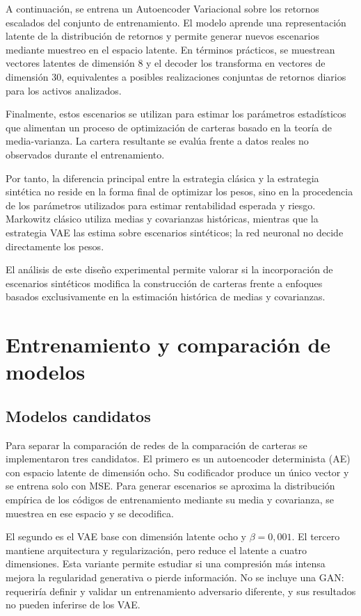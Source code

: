 A continuación, se entrena un Autoencoder Variacional sobre los retornos escalados del conjunto de entrenamiento. El modelo aprende una representación latente de la distribución de retornos y permite generar nuevos escenarios mediante muestreo en el espacio latente. En términos prácticos, se muestrean vectores latentes de dimensión 8 y el decoder los transforma en vectores de dimensión 30, equivalentes a posibles realizaciones conjuntas de retornos diarios para los activos analizados.

Finalmente, estos escenarios se utilizan para estimar los parámetros estadísticos que alimentan un proceso de optimización de carteras basado en la teoría de media-varianza. La cartera resultante se evalúa frente a datos reales no observados durante el entrenamiento.

Por tanto, la diferencia principal entre la estrategia clásica y la estrategia sintética no reside en la forma final de optimizar los pesos, sino en la procedencia de los parámetros utilizados para estimar rentabilidad esperada y riesgo. Markowitz clásico utiliza medias y covarianzas históricas, mientras que la estrategia VAE las estima sobre escenarios sintéticos; la red neuronal no decide directamente los pesos.

El análisis de este diseño experimental permite valorar si la incorporación de escenarios sintéticos modifica la construcción de carteras frente a enfoques basados exclusivamente en la estimación histórica de medias y covarianzas.

\section{Entrenamiento y comparación de modelos}

\subsection{Modelos candidatos}
Para separar la comparación de redes de la comparación de carteras se implementaron tres candidatos. El primero es un autoencoder determinista (AE) con espacio latente de dimensión ocho. Su codificador produce un único vector y se entrena solo con MSE. Para generar escenarios se aproxima la distribución empírica de los códigos de entrenamiento mediante su media y covarianza, se muestrea en ese espacio y se decodifica.

El segundo es el VAE base con dimensión latente ocho y $\beta=0{,}001$. El tercero mantiene arquitectura y regularización, pero reduce el latente a cuatro dimensiones. Esta variante permite estudiar si una compresión más intensa mejora la regularidad generativa o pierde información. No se incluye una GAN: requeriría definir y validar un entrenamiento adversario diferente, y sus resultados no pueden inferirse de los VAE.

